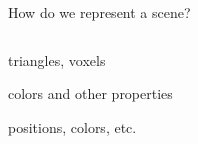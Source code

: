 \documentclass[10pt]{beamer}
\begin{document}
\begin{frame}{How do we represent a scene?}
  \begin{columns}
    \begin{column}{0.5\textwidth}
      \begin{description}[<+>]
        \item[Geometry] triangles, voxels %
        \item[Materials] colors and other properties %
        \item[Lights] positions, colors, etc.
      \end{description}
    \end{column}
    \begin{column}{0.5\textwidth}


\end{column}
\end{columns}
\end{frame}
\end{document}
